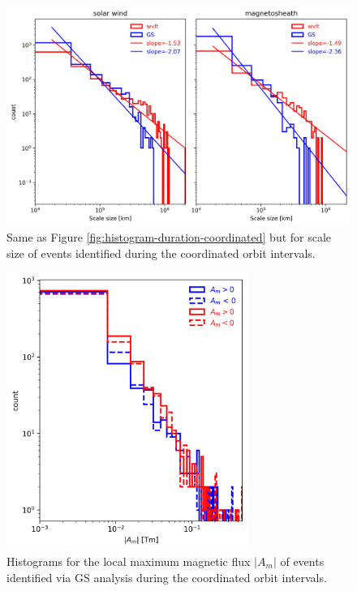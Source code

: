 \begin{figure}
    \centering
    \includegraphics[width=\textwidth]{Figures/Histograms/scalesize_coordinated.png}
    \caption[Histogram of scale size from coordinated analysis]{Same as Figure \ref{fig:histogram-duration-coordinated} but for scale size of events identified during the coordinated orbit intervals.}
    \label{fig:histogram-scalesize-coordinated}
\end{figure}

\begin{figure}
    \centering
    \includegraphics[width=0.7\textwidth]{Figures/Histograms/Asplit_coordinated.png}
    \caption[Histogram of poloidal magnetic ﬂux per unit length from coordinated analysis]{Histograms for the local maximum magnetic flux $|A_m|$ of events identified via GS analysis during the coordinated orbit intervals.} %
    \label{fig:histogram-Asplit-coordinated}
\end{figure}


